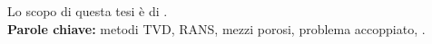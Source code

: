 Lo scopo di questa tesi è di .
\\[\baselineskip]
\textbf{Parole chiave:} metodi TVD, RANS, mezzi porosi, problema accoppiato, 
\DUMUX.